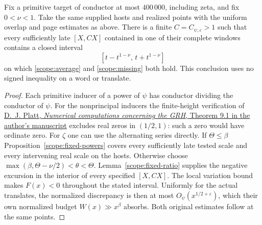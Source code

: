 \begin{corollary}
\label{scope:bounded-conductor-intervals}
Fix a primitive target of conductor at most \(400\,000\), including
zeta, and fix \(0<\nu<1\). Take the same supplied hosts and realized
points with the uniform overlap and page estimates as above.
There is a finite \(C=C_{\psi,\varepsilon}>1\) such that every
sufficiently late \([X,CX]\) contained in one of their complete
windows contains a closed interval
\[
        [t-t^{1-\nu},\,t+t^{1-\nu}]
\]
on which \eqref{scope:average} and \eqref{scope:missing} both hold.
This conclusion uses no signed inequality on a word or translate.
\end{corollary}
\begin{proof}
Each primitive inducer of a power of \(\psi\) has conductor dividing
the conductor of \(\psi\). For the nonprincipal inducers the
finite-height verification of
\href{https://research-information.bris.ac.uk/files/67056136/platt_grh3.0.pdf}
{D.~J. Platt, \emph{Numerical computations concerning the GRH},
Theorem 9.1 in the author's manuscript} excludes real zeros in
\((1/2,1)\): such a zero would have ordinate zero. For \(\zeta\)
one can use the alternating series directly. If \(\Theta\le\beta\)
Proposition~\ref{scope:fixed-powers} covers every sufficiently
late tested scale and every intervening real scale on the hosts.
Otherwise choose \(\max(\beta,\Theta-\nu/2)<\theta<\Theta\).
Lemma~\ref{scope:fixed-ratio} supplies the negative excursion
in the interior of every specified \([X,CX]\).
The local variation bound makes \(F(x)<0\) throughout the stated
interval. Uniformly for the actual translates, the normalized
discrepancy is then at most \(O_\psi(x^{1/2+\varepsilon})\),
which their own normalized budget \(W(x)\gg x^\beta\) absorbs.
Both original estimates follow at the same points.
\end{proof}

